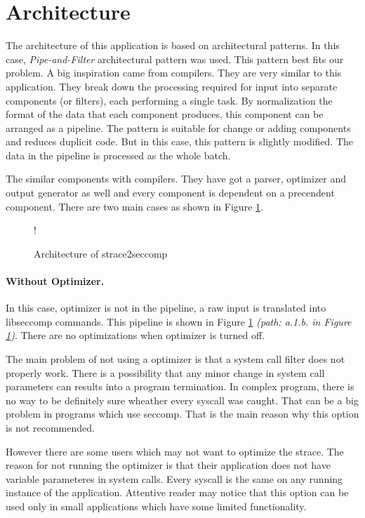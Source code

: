 \section{Architecture}
The architecture of this application is based on architectural patterns.
In this case, \textit{Pipe-and-Filter} \cite{PipeAndFilter} architectural pattern was used.
This pattern best fits our  problem. A big inspiration came from compilers. They
are very similar to this application. They break down the processing required
for input into separate components (or filters), each performing a single task.
By normalization the format of the data that each component produces, this
component can be arranged as a pipeline. The pattern is suitable for change or
adding components and reduces duplicit code. But in this case, this pattern is
slightly modified. The data in the pipeline is processed as the whole batch.

The similar components with compilers. They have got a parser, optimizer and
output generator as well and every component is dependent on a precendent
component. There are two main cases as shown in Figure
\ref{fig:tikz:architecture}.

\begin{figure}[H]
  \centering
  \resizebox {\textwidth} {!} {
    
  }
  \caption{Architecture of strace2seccomp}
  \label{fig:tikz:architecture}
\end{figure}

\paragraph{Without Optimizer.}
In this case, optimizer is not in the pipeline, a raw input is translated into
libseccomp commands. This pipeline is shown in Figure
\ref{fig:tikz:architecture} \textit{(path: a.1.b. in Figure
\ref{fig:tikz:architecture})}. There are no optimizations when optimizer is
turned off.

The main problem of not using a optimizer is that a system call filter does not
properly work. There is a possibility that any minor change in system call
parameters can results into a program termination. In complex program, there is
no way to be definitely sure wheather every syscall was caught. That can be a
big problem in programs which use seccomp. That is the main reason why this
option is not recommended.

However there are some users which may not want to optimize the strace. The
reason for not running the optimizer is that their application does not have
variable parameteres in system calls. Every syscall is the same on any running
instance of the application. Attentive reader may notice that this option can be
used only in small applications which have some limited functionality.

